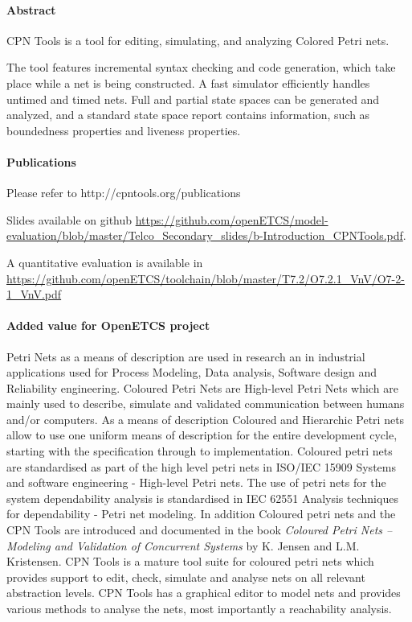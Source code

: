  \paragraph{Abstract} CPN Tools is a tool for editing, simulating, and analyzing Colored Petri nets.
 
 The tool features incremental syntax checking and code generation, which take place while a net is being constructed. A fast simulator efficiently handles untimed and timed nets. Full and partial state spaces can be generated and analyzed, and a standard state space report contains information, such as boundedness properties and liveness properties.
 
 \paragraph{Publications} Please refer to http://cpntools.org/publications
 
 Slides available on github \url{https://github.com/openETCS/model-evaluation/blob/master/Telco_Secondary_slides/b-Introduction_CPNTools.pdf}.
 
 A quantitative evaluation is available in \url{https://github.com/openETCS/toolchain/blob/master/T7.2/O7.2.1_VnV/O7-2-1_VnV.pdf}
 
 \paragraph{Added value for OpenETCS project}
 
 Petri Nets as a means of description are used in research an in industrial applications used for Process Modeling, Data analysis, Software design and Reliability engineering. Coloured Petri Nets are  High-level Petri Nets which are mainly used to describe, simulate and validated communication between humans and/or computers. As a means of description Coloured and  Hierarchic Petri nets allow to use one uniform means of description for the entire development cycle, starting with  the specification through to  implementation. 
 Coloured petri nets are standardised as part of the high level petri nets in ISO/IEC 15909 Systems and software engineering - High-level Petri nets. The use of petri nets for the system dependability analysis is standardised in IEC 62551 Analysis techniques for dependability - Petri net modeling. In addition Coloured petri nets and the CPN Tools are introduced and documented in the book \textit{Coloured Petri Nets -- Modeling and Validation of Concurrent Systems} by K. Jensen and L.M. Kristensen. CPN Tools is a mature tool suite for coloured petri nets which provides support to edit, check, simulate and analyse nets on all relevant abstraction levels. CPN Tools has a graphical editor to model nets and provides various methods to analyse the nets, most importantly a reachability analysis. 
 
